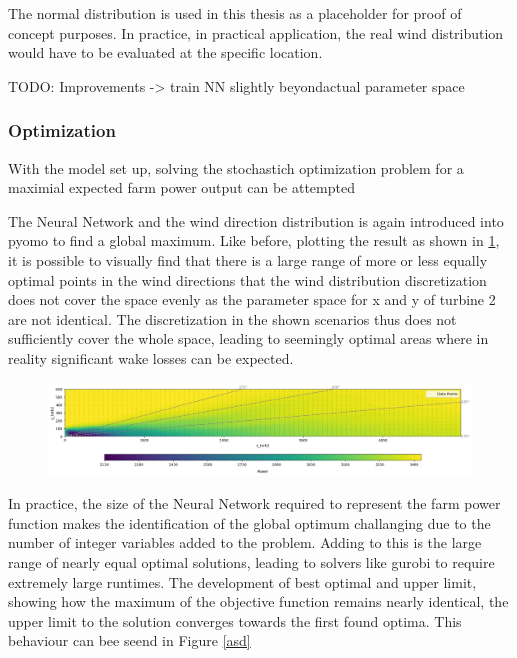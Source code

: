 The normal distribution is used in this thesis as a placeholder for proof of concept purposes. In practice, in practical application, the real wind distribution would have to be evaluated at the specific location. 

TODO: Improvements -> train NN slightly beyondactual parameter space

\subsubsection{Optimization}

With the model set up, solving the stochastich optimization problem for a maximial expected farm power output can be attempted

The Neural Network and the wind direction distribution is  again introduced into pyomo to find a global maximum. Like before, plotting the result as shown in \ref{fig:prob_data_lininter}, it is possible to visually find that there is a large range of more or less equally optimal points in the wind directions that the wind distribution discretization does not cover the space evenly as the parameter space for x and y of turbine 2 are not identical. The discretization in the shown scenarios thus does not sufficiently cover the whole space, leading to seemingly optimal areas where in reality significant wake losses can be expected.


\begin{figure}[h] 
	\centering
	\includegraphics[width=1\textwidth]{figures/optimization/prob_data_lininter.png} 
	\caption{}
	\label{fig:prob_data_lininter}
\end{figure}

In practice, the size of the Neural Network required to represent the farm power function makes the identification of the global optimum challanging due to the number of integer variables added to the problem. Adding to this is the large range of nearly equal optimal solutions, leading to solvers like gurobi to require extremely large runtimes. The development of best optimal and upper limit, showing how the maximum of the objective function remains nearly identical, the upper limit to the solution converges towards the first found optima. This behaviour can bee seend in Figure \ref{asd}

